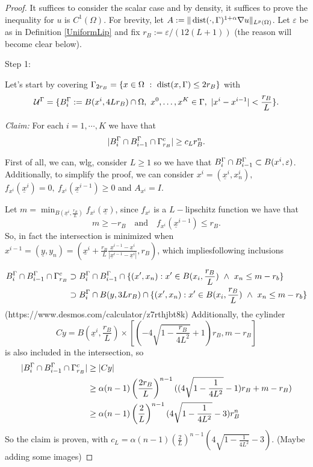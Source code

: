 \begin{proof}
It suffices to consider the scalar case and  by density, it suffices to prove the inequality for $u$ is $C^1(\Omega)$. For brevity, let $A:=\|\operatorname{dist}(\cdot, \Gamma)^{1+\alpha} \nabla u\|_{L^p(\Omega)}$. Let $\varepsilon$ be as in Definition \ref{UniformLip} and fix $r_B:=\varepsilon /(12(L+1))$ (the reason will become clear below). 

Step 1:

Let's start by covering $\Gamma_{2r_B}= \{x\in \Omega\ :\ \operatorname{dist}(x,\Gamma)\leq 2r_B\} $ with 
$$\mathcal{U}^\Gamma= \{ B^\Gamma_i := B(x^i, 4Lr_B)\cap \Omega,\ x^0,\ldots, x^K \in \Gamma,\ |x^i-x^{i-1}|< \frac{r_B}{L}\}.$$

\textit{Claim:} For each $i=1,\cdots, K$ we have that
$$|B^\Gamma_i\cap B_{i-1}^\Gamma\cap \Gamma^c_{r_B}|\geq c_L r_B^n.$$


First of all, we can, wlg, consider $L\geq 1$ so we have that $B^\Gamma_i\cap B_{i-1}^\Gamma\subset B(x^i,\varepsilon)$. Additionally, to simplify the proof, we can consider $x^i=(\underline{x}^i,x^i_n),$ $f_{x^i}(\underline{x}^i)=0,\ f_{x^{i}}(\underline{x}^{i-1})\geq 0$ and $A_{x^i}=I$.

Let $m = \min_{B(\underline{x}^i,\frac{r_B}{L})} f_{x^i}(\underline{x})$, since $f_{x^i}$ is a $L-$lipschitz function we have that
$$m \geq - r_B\quad\text{and}\quad f_{x^{i}}(\underline{x}^{i-1})\leq r_B.$$
 So, in fact the intersection is minimized when  $x^{i-1}=(\underline{y},y_n)= (\underline{x}^i+\frac{r_B}{L}\frac{\underline{x}^{i-1}-\underline{x}^i}{|\underline{x}^{i-1}-\underline{x}^i|},r_B)$, which impliesfollowing inclusions

\begin{align*}
    B^\GG_i\cap B^\GG_{i-1}\cap\GG^c_{r_B}&\supset
     B^\GG_i\cap B^\GG_{i-1}\cap \{(x',x_n): x'\in B(x_i,\frac{r_B}{L})\ \wedge\  x_n\leq m-r_b\}\\&\supset
    B^\GG_i\cap B(y, 3Lr_B)\cap \{(x',x_n): x'\in B(x_i,\frac{r_B}{L})\ \wedge\  x_n\leq m-r_b\}
\end{align*}
(https://www.desmos.com/calculator/z7rthjbt8k)   
Additionally, the cylinder $$Cy = B(\underline{x}^{i},\frac{r_B}{L})\times [(-4\sqrt{1-\frac{r_B}{4L^2}}+1)r_B,m-r_B]$$ is  also included in the intersection, so
\begin{align*}
    |B^\Gamma_i\cap B_{i-1}^\Gamma\cap \Gamma^c_{r_B}|&\geq |Cy|\\
    &\geq \alpha(n-1)\left(\frac{2r_B}{L}\right)^{n-1}((4\sqrt{1-\frac{1}{4L^2}}-1)r_B+m-r_B)\\
        & \geq \alpha(n-1)\left(\frac{2}{L}\right)^{n-1}(4\sqrt{1-\frac{1}{4L^2}}-3)r_B^n 
\end{align*}
So the claim is proven, with $c_L =\alpha(n-1)\left(\frac{2}{L}\right)^{n-1}(4\sqrt{1-\frac{1}{4L^2}}-3)$.
(Maybe adding some images)


\end{proof}
